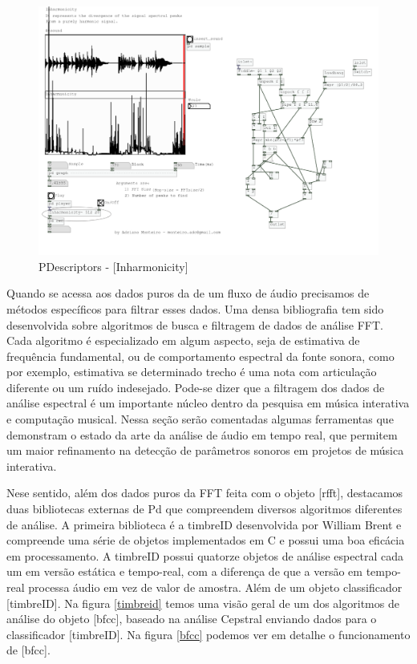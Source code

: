 \documentclass[draft]{ppgmus}
\begin{document}
\begin{figure}
\includegraphics[scale=.7]{pdescriptor}
\caption{PDescriptors - [Inharmonicity\texttildelow]}
\label{pdescriptor}
\end{figure} 


Quando se acessa aos dados puros da de um fluxo de áudio precisamos de 
métodos específicos para filtrar esses dados. Uma densa bibliografia
tem sido desenvolvida sobre algoritmos de busca e filtragem de dados de
análise FFT. Cada algoritmo é especializado em algum aspecto, seja de
estimativa de frequência fundamental, ou de comportamento espectral da fonte sonora,
como por exemplo, estimativa se determinado trecho é uma nota com articulação diferente
ou um ruído indesejado.
Pode-se dizer que a filtragem dos dados de análise espectral é um importante
núcleo dentro da pesquisa em música interativa e computação musical. Nessa seção
serão comentadas algumas ferramentas que demonstram o estado da arte da análise de 
áudio em tempo real, que permitem um maior refinamento na detecção de parâmetros
sonoros em projetos de música interativa.

Nese sentido, além dos dados puros da FFT feita com o objeto [rfft\texttildelow],
destacamos duas bibliotecas externas de Pd que compreendem diversos algoritmos
diferentes de análise. A primeira biblioteca é a 
timbreID desenvolvida por William Brent e compreende uma série de objetos
implementados em C e possui uma boa eficácia em processamento. A timbreID possui 
quatorze objetos de análise espectral cada um em versão estática e tempo-real, com a diferença
de que a versão em tempo-real processa áudio em vez de valor de amostra. Além
de um objeto classificador [timbreID]. Na figura \ref{timbreid} temos
uma visão geral de um dos algoritmos de análise do objeto  [bfcc\texttildelow], baseado na 
análise Cepstral enviando dados para o classificador [timbreID]. Na figura \ref{bfcc} podemos
ver em detalhe o funcionamento de [bfcc\texttildelow].
\end{document}
